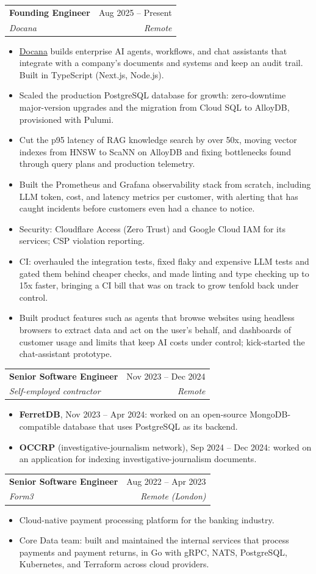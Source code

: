 \documentclass[letterpaper,12pt]{article}
\makeatletter
\newcommand{\resumeItem}[1]{
  \item
    {#1 \vspace{-2pt}}
}
\newcommand{\resumeSubheading}[4]{
  \vspace{-2pt}\item
    \begin{tabular*}{0.97\textwidth}[t]{l@{\extracolsep{\fill}}r}
      \textbf{#1} & #2 \\
      \textit{\small#3} & \textit{\small #4} \\
    \end{tabular*}\vspace{-7pt}
}
\newcommand{\resumeLead}[1]{
  \vspace{2pt}\item[] {#1 \vspace{-2pt}}
}
\newcommand{\resumeItemListStart}{\begin{itemize}}
\newcommand{\resumeItemListEnd}{\end{itemize}}
\makeatother
\begin{document}
    \resumeSubheading
      {Founding Engineer}{Aug 2025 -- Present}
      {Docana}{Remote}
      \resumeItemListStart
        \resumeLead{\href{https://docana.com/}{Docana} builds enterprise AI agents, workflows, and chat assistants that integrate with a company's documents and systems and keep an audit trail. Built in TypeScript (Next.js, Node.js).}
        \resumeItem{Scaled the production PostgreSQL database for growth: zero-downtime major-version upgrades and the migration from Cloud SQL to AlloyDB, provisioned with Pulumi.}
        \resumeItem{Cut the p95 latency of RAG knowledge search by over 50x, moving vector indexes from HNSW to ScaNN on AlloyDB and fixing bottlenecks found through query plans and production telemetry.}
        \resumeItem{Built the Prometheus and Grafana observability stack from scratch, including LLM token, cost, and latency metrics per customer, with alerting that has caught incidents before customers even had a chance to notice.}
        \resumeItem{Security: Cloudflare Access (Zero Trust) and Google Cloud IAM for its services; CSP violation reporting.}
        \resumeItem{CI: overhauled the integration tests, fixed flaky and expensive LLM tests and gated them behind cheaper checks, and made linting and type checking up to 15x faster, bringing a CI bill that was on track to grow tenfold back under control.}
        \resumeItem{Built product features such as agents that browse websites using headless browsers to extract data and act on the user's behalf, and dashboards of customer usage and limits that keep AI costs under control; kick-started the chat-assistant prototype.}
      \resumeItemListEnd

    \resumeSubheading
      {Senior Software Engineer}{Nov 2023 -- Dec 2024}
      {Self-employed contractor}{Remote}
      \resumeItemListStart
        \resumeItem{\textbf{FerretDB}, Nov 2023 -- Apr 2024: worked on an open-source MongoDB-compatible database that uses PostgreSQL as its backend.}
        \resumeItem{\textbf{OCCRP} (investigative-journalism network), Sep 2024 -- Dec 2024: worked on an application for indexing investigative-journalism documents.}
      \resumeItemListEnd

    \resumeSubheading
      {Senior Software Engineer}{Aug 2022 -- Apr 2023}
      {Form3}{Remote (London)}
      \resumeItemListStart
        \resumeLead{Cloud-native payment processing platform for the banking industry.}
        \resumeItem{Core Data team: built and maintained the internal services that process payments and payment returns, in Go with gRPC, NATS, PostgreSQL, Kubernetes, and Terraform across cloud providers.}
      \resumeItemListEnd
\end{document}
